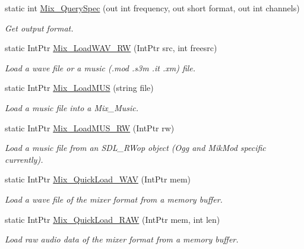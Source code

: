 \begin{DoxyCompactItemize}
static int \hyperlink{namespace_tao_1_1_sdl_ab493fab00390986c858d5441fa7e3aa6}{Mix\_\-QuerySpec} (out int frequency, out short format, out int channels)
\begin{DoxyCompactList}\small\item\em Get output format. \item\end{DoxyCompactList}\item 
static IntPtr \hyperlink{namespace_tao_1_1_sdl_acca6b94c1e8a3ff545f110838532fba9}{Mix\_\-LoadWAV\_\-RW} (IntPtr src, int freesrc)
\begin{DoxyCompactList}\small\item\em Load a wave file or a music (.mod .s3m .it .xm) file. \item\end{DoxyCompactList}\item 
static IntPtr \hyperlink{namespace_tao_1_1_sdl_ad6c75b94200b928986e8761beab8d85d}{Mix\_\-LoadMUS} (string file)
\begin{DoxyCompactList}\small\item\em Load a music file into a Mix\_\-Music. \item\end{DoxyCompactList}\item 
static IntPtr \hyperlink{namespace_tao_1_1_sdl_a704960ed3bb8745e7233751ae3e3fc3f}{Mix\_\-LoadMUS\_\-RW} (IntPtr rw)
\begin{DoxyCompactList}\small\item\em Load a music file from an SDL\_\-RWop object (Ogg and MikMod specific currently). \item\end{DoxyCompactList}\item 
static IntPtr \hyperlink{namespace_tao_1_1_sdl_a40245bd40987284be35aa5b48b838bae}{Mix\_\-QuickLoad\_\-WAV} (IntPtr mem)
\begin{DoxyCompactList}\small\item\em Load a wave file of the mixer format from a memory buffer. \item\end{DoxyCompactList}\item 
static IntPtr \hyperlink{namespace_tao_1_1_sdl_ab61ffe3d06eba56825d8798ffa9ac013}{Mix\_\-QuickLoad\_\-RAW} (IntPtr mem, int len)
\begin{DoxyCompactList}\small\item\em Load raw audio data of the mixer format from a memory buffer. \item\end{DoxyCompactList}\item 

\end{DoxyCompactItemize}

